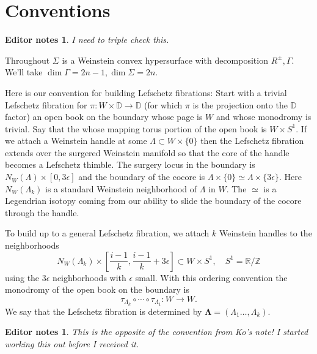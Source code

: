 \documentclass[11pt]{amsart}
\newcommand{\thicc}[1]{\pmb{#1}}
\newcommand{\R}{\mathbb{R}}
\newcommand{\Z}{\mathbb{Z}}
\newcommand{\disk}{\mathbb{D}}
\newcommand{\Circle}{S^{1}}
\newcommand{\hypersurface}{\Sigma}
\newcommand{\posNegRegion}{R^{\pm}}
\newcommand{\Leg}{\Lambda}
\newcommand{\thiccLeg}{\thicc{\Leg}}
\newcommand{\divSet}{\Gamma}
\newtheorem{edits}[thm]{Editor notes}
\begin{document}
\section{Conventions}

\begin{edits}
I need to triple check this.
\end{edits}

Throughout $\hypersurface$ is a Weinstein convex hypersurface with decomposition $\posNegRegion, \divSet$. We'll take $\dim \divSet = 2n-1, \dim \hypersurface = 2n$.

Here is our convention for building Lefschetz fibrations: Start with a trivial Lefschetz fibration for $\pi: W \times \disk \rightarrow \disk$ (for which $\pi$ is the projection onto the $\disk$ factor) an open book on the boundary whose page is $W$ and whose monodromy is trivial. Say that the whose mapping torus portion of the open book is $W \times \Circle$. If we attach a Weinstein handle at some $\Leg \subset W \times \{0\}$ then the Lefschetz fibration extends over the surgered Weinstein manifold so that the core of the handle becomes a Lefschetz thimble. The surgery locus in the boundary is $N_{W}(\Leg) \times [0, 3\epsilon]$ and the boundary of the cocore is $\Leg \times \{0\} \simeq \Leg \times \{3\epsilon\}$. Here $N_{W}(\Leg_{k})$ is a standard Weinstein neighborhood of $\Leg$ in $W$. The $\simeq$ is a Legendrian isotopy coming from our ability to slide the boundary of the cocore through the handle.

To build up to a general Lefschetz fibration, we attach $k$ Weinstein handles to the neighborhoods
\begin{equation*}
N_{W}(\Leg_{k}) \times \left[\frac{i-1}{k}, \frac{i-1}{k} + 3\epsilon  \right] \subset W \times \Circle, \quad \Circle = \R / \Z
\end{equation*}
using the $3\epsilon$ neighborhoods with $\epsilon$ small. With this ordering convention the monodromy of the open book on the boundary is
\begin{equation*}
\tau_{\Leg_{k}} \circ \cdots \circ \tau_{\Leg_{1}}: W \rightarrow W.
\end{equation*}
We say that the Lefschetz fibration is determined by $\thiccLeg = (\Leg_{1} \dots, \Leg_{k})$.

\begin{edits}
This is the opposite of the convention from Ko's note! I started working this out before I received it.
\end{edits}
\end{document}
